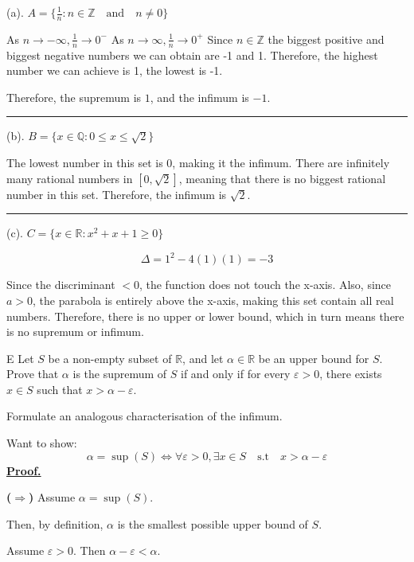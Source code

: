 \documentclass[]{article}
\begin{document}
(a). $A = \{\frac{1}{n} : n \in \mathbb{Z} \quad \text{and} \quad n \ne 0\}$

As $n \to -\infty, \frac{1}{n} \to 0^-$
As $n \to \infty, \frac{1}{n} \to 0^+$
Since $n \in \mathbb{Z}$ the biggest positive and biggest negative numbers we can obtain
are -1 and 1. Therefore, the highest number we can achieve is 1, the lowest is -1.

Therefore, the supremum is $1$, and the infimum is $-1$.
\vspace{0.1in}
\hrule
\vspace{0.1in}
(b). $B = \{x \in \mathbb{Q}: 0 \le x \le \sqrt{2}\}$

The lowest number in this set is 0, making it the infimum. There are infinitely many
rational numbers in $[0, \sqrt{2}]$, meaning that there is no biggest rational number in this set.
Therefore, the infimum is $\sqrt{2}$.
\vspace{0.1in}
\hrule
\vspace{0.1in}

(c). $C = \{x \in \mathbb{R}: x^2 + x + 1 \ge 0\}$

\[
    \Delta = 1^2 - 4(1)(1) = -3
\]

Since the discriminant $< 0$, the function does not touch the x-axis. Also, since $a > 0$, the parabola is entirely above the x-axis, 
making this set contain all real numbers. Therefore, there is no
upper or lower bound, which in turn means there is no supremum or infimum.

\begin{question}{E}
     Let $S$ be a non-empty subset of $\mathbb{R}$, and let $\alpha \in \mathbb{R}$ be an upper bound
for $S$. Prove that $\alpha$ is the supremum of $S$ if and only if for every $\varepsilon > 0$,
there exists $x \in S$ such that $x > \alpha - \varepsilon$.

Formulate an analogous characterisation of the infimum.
\end{question}

Want to show:
\[
    \alpha = \sup(S) \iff \forall \varepsilon > 0, \exists x \in S \quad \text{s.t} \quad x > \alpha - \varepsilon
\]
\underline{\textbf{Proof.}}  

\medskip

\noindent \textbf{($\Rightarrow$)}  
Assume $\alpha = \sup(S)$.  

Then, by definition, $\alpha$ is the smallest possible upper bound of $S$.

Assume $\varepsilon > 0$. Then $\alpha - \varepsilon < \alpha$. 
\end{document}
